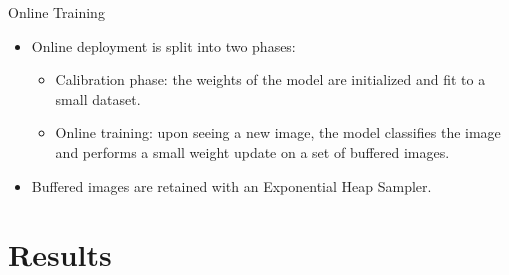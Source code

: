 \documentclass[10pt]{beamer}
\begin{document}
\begin{frame}{Online Training}
\begin{itemize}

\item Online deployment is split into two phases:
\begin{itemize}
\item \alert{Calibration phase:} the weights of the model are initialized and fit to a small dataset.

\item \alert{Online training:} upon seeing a new image, the model classifies the image and performs a small weight update on a set of buffered images.
\end{itemize}

\pause

\item Buffered images are retained with an \alert{Exponential Heap Sampler}.\\[0.35cm]


\end{itemize}
\end{frame}

\section{Results}
\end{document}
